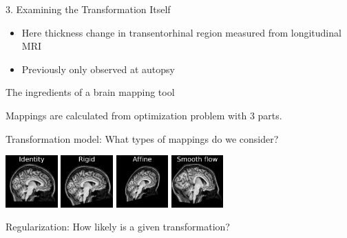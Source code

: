 \documentclass{beamer}
\begin{document}
\begin{frame}{3. Examining the Transformation Itself}
\begin{center}
\end{center}
\vspace{-1em}
\begin{itemize}
\item Here thickness change in transentorhinal region measured from longitudinal MRI
\item Previously only observed at autopsy
\end{itemize}

\end{frame}










\begin{frame}{The ingredients of a brain mapping tool}

Mappings are calculated from optimization problem with 3 parts.

\vspace{1em}

Transformation model: What types of mappings do we consider?

\includegraphics[width=0.15\textwidth]{ex2_id}
\includegraphics[width=0.15\textwidth]{ex2_rigid}
\includegraphics[width=0.15\textwidth]{ex2_affine}
\includegraphics[width=0.15\textwidth]{ex2_flow}



\vspace{1em}
Regularization: How likely is a given transformation?


\end{frame}
\end{document}
